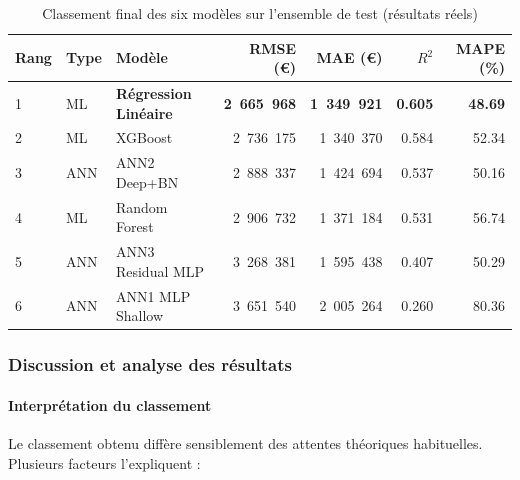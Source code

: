 \documentclass[12pt,a4paper]{article}
\begin{document}
\begin{table}[H]
\centering
\begin{tabular}{@{}lllrrrr@{}}
\toprule
\textbf{Rang} & \textbf{Type} & \textbf{Modèle} &
\textbf{RMSE (€)} & \textbf{MAE (€)} & \textbf{$R^2$} & \textbf{MAPE (\%)} \\ \midrule
1 & ML  & \textbf{Régression Linéaire}  & \textbf{2~665~968} & \textbf{1~349~921} & \textbf{0.605} & \textbf{48.69} \\
2 & ML  & XGBoost                       & 2~736~175          & 1~340~370          & 0.584          & 52.34          \\
3 & ANN & ANN2 Deep+BN                  & 2~888~337          & 1~424~694          & 0.537          & 50.16          \\
4 & ML  & Random Forest                 & 2~906~732          & 1~371~184          & 0.531          & 56.74          \\
5 & ANN & ANN3 Residual MLP             & 3~268~381          & 1~595~438          & 0.407          & 50.29          \\
6 & ANN & ANN1 MLP Shallow              & 3~651~540          & 2~005~264          & 0.260          & 80.36          \\ \bottomrule
\end{tabular}
\caption{Classement final des six modèles sur l'ensemble de test (résultats réels)}
\end{table}

\subsubsection{Discussion et analyse des résultats}

\paragraph{Interprétation du classement}

Le classement obtenu diffère sensiblement des attentes théoriques habituelles. Plusieurs
facteurs l'expliquent :
\end{document}

